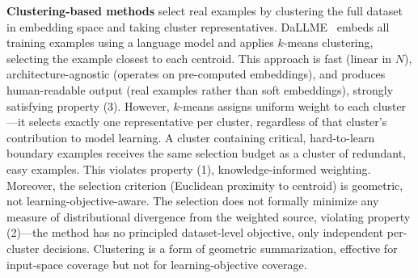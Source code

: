 \begin{foldable}
  \textbf{Clustering-based methods} select real examples by clustering the full dataset in embedding space and taking cluster representatives.
  DaLLME~\cite{tao2024textual} embeds all training examples using a language model and applies $k$-means clustering, selecting the example closest to each centroid.
  This approach is fast (linear in $N$), architecture-agnostic (operates on pre-computed embeddings), and produces human-readable output (real examples rather than soft embeddings), strongly satisfying property (3).
  However, $k$-means assigns uniform weight to each cluster---it selects exactly one representative per cluster, regardless of that cluster's contribution to model learning.
  A cluster containing critical, hard-to-learn boundary examples receives the same selection budget as a cluster of redundant, easy examples.
  This violates property (1), knowledge-informed weighting.
  Moreover, the selection criterion (Euclidean proximity to centroid) is geometric, not learning-objective-aware.
  The selection does not formally minimize any measure of distributional divergence from the weighted source, violating property (2)---the method has no principled dataset-level objective, only independent per-cluster decisions.
  Clustering is a form of geometric summarization, effective for input-space coverage but not for learning-objective coverage.
\end{foldable}

